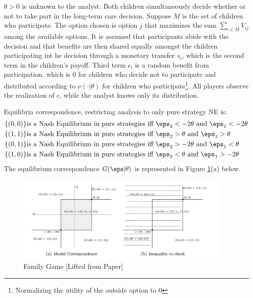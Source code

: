 $\theta > 0$ is unknown to the analyst. Both children simultaneously decide whether or not to take part in the long-term care decision. Suppose $M$ is the set of children who participate. The option chosen is option $j$ that maximizes the sum $\sum_{i\in M} V_{ij}$ among the available options. It is assumed that participants abide with the decision and that benefits are then shared equally amongst the children participating int he decision through a monetary transfer $s_i$, which is the second term in the children's payoff. Third term $\epsilon_i$ is a random benefit from participation, which is $0$ for children who decide not to participate and distributed according to $\nu(\cdot | \theta)$ for children who participate\footnote{Normalizing the utility of the outside option to 0}. All players observe the realization of $\epsilon$, while the analyst knows only its distribution.

Equilibria correspondence, restricting analysis to only pure strategy NE is:
\begin{align*}
	\{(0,0)\}&\text{is a Nash Equilibrium in pure strategies iff }\eps_2 < -2\theta\text{ and }\eps_1 < -2\theta \\
	\{(1,1)\}&\text{is a Nash Equilibrium in pure strategies iff }\eps_2 > \theta\text{ and }\eps_1  > \theta \\
	\{(0,1)\}&\text{is a Nash Equilibrium in pure strategies iff }\eps_2 > -2\theta\text{ and }\eps_1  < \theta \\
	\{(1,0)\}&\text{is a Nash Equilibrium in pure strategies iff }\eps_2 < \theta\text{ and }\eps_1  > -2\theta
\end{align*}
The equilibrium correspondence $G(\eps|\theta)$ is represented in Figure \ref{fig:GH-1}(a) below.
\begin{figure}[htb!]
	\centering
	\includegraphics[width=0.95\textwidth]{figures/GH-Fig1}
	\caption{Family Game [Lifted from Paper]}
	\label{fig:GH-1}
\end{figure}

